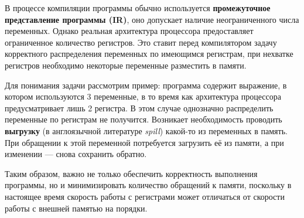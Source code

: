 В процессе компиляции программы обычно используется \textbf{промежуточное представление программы (IR)}, оно допускает
наличие неограниченного числа переменных. Однако реальная архитектура процессора предоставляет ограниченное
количество регистров. Это ставит перед компилятором задачу корректного распределения переменных по имеющимся
регистрам, при нехватке регистров необходимо некоторые переменные разместить в памяти. %

Для понимания задачи рассмотрим пример: программа содержит выражение, в котором используются 3 переменные,
в то время как архитектура процессора предусматривает лишь 2 регистра.
В этом случае однозначно распределить переменные по регистрам не получится.
Возникает необходимость проводить \textbf{выгрузку} (в англоязычной литературе \textit{spill})
какой-то из переменных в память. При обращении к этой переменной потребуется загрузить
её из памяти, а при изменении — снова сохранить обратно.

Таким образом, важно не только обеспечить корректность выполнения программы, но и минимизировать количество обращений к памяти,
поскольку в настоящее время скорость работы с регистрами может отличаться от скорости работы с внешней памятью на порядки.